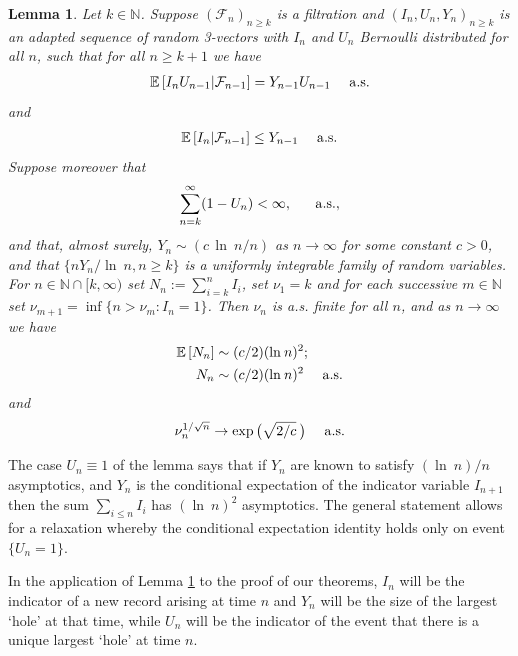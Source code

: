 \documentclass[12pt]{article}
\newcommand{\N}{\mathbb{N}}
\newcommand{\cF}{\mathcal{F}}
\newcommand{\E}{\mathbb E \,}
\renewcommand{\emptyset}{\varnothing}
\newcommand{\F}{{\cal F}}
\renewcommand{\log}{{\ln \:}}
\newtheorem{lemm}{Lemma}
\begin{document}
\begin{lemm}
	\label{l:genrec}
	Let $k \in \N$.
	Suppose $(\cF_n)_{n \geq k}$ is a filtration and
	$(I_n,U_n,Y_n)_{n \geq k}$
	is an adapted sequence of random 3-vectors with $I_n$
	and $U_n$ Bernoulli distributed for all $n$, 
	such that for all $n \geq k+1$ we have %
	\begin{align}
		\E [ I_nU_{n-1} | \F_{n-1} ] = Y_{n-1} U_{n-1} ~~~~ {\rm a.s.}
\label{0116c}
	\end{align}
	and 
	\begin{align}
		\E[ I_n | \F_{n-1} ] \leq Y_{n-1} ~~~~ {\rm a.s.}
	\label{e:squeeze}
	\end{align}
	Suppose moreover that %
	\begin{align}
		\sum_{n=k}^\infty (1- U_n)  < \infty, ~~~~~{\rm a.s.},
		\label{e:Enev}
		\end{align}
	and that,  almost surely, $Y_n \sim (c\, \log n/n)$ as
	$n \to \infty$ for some constant $c >0$,
	and that $\{n Y_n/\log n, n \geq k\}$ is a uniformly integrable
	family of random variables. For $n \in \N \cap [k,\infty)$ set
	$N_n := \sum_{i=k}^n I_i$, set
$\nu_{1} =k$ and for each successive $m \in \N$ set
	$\nu_{m+1} = \inf\{n > \nu_{m}: I_n =1 \}$. 
	Then $\nu_n$ is a.s. finite for all $n$, and as $n \to \infty$ we have 
	\begin{align}
		\E[N_{n}] & \sim (c/2)( \log n )^2;
\label{0125ac}
		\\
		N_{n} & \sim (c/2)( \log n )^2
~~~~{\rm a.s.}
\label{0125bc}
	\end{align} 
and
	\begin{align}
	\nu_{n}^{1/\sqrt{n}} \to \exp \big( \sqrt{2/c} \: \big)   
~~~~{\rm a.s.}
\label{0125cc}
	\end{align}
\end{lemm}
The case $U_n \equiv 1$ of the
lemma says that if $Y_n$ are known to satisfy $(\log n)/n$ asymptotics,
and $Y_n$ is the conditional expectation of the indicator variable 
$I_{n+1}$
then the sum $\sum_{i \leq n} I_i$ has $(\log n)^2$ asymptotics. 
The  general statement allows for a relaxation whereby the
conditional expectation identity holds only on event $\{U_n=1\}$.

In the application of Lemma \ref{l:genrec} to the proof of our theorems,
$I_n$ will be the indicator of a new record arising at time $n$ and
$Y_n$ will be the size of the largest `hole' at that time, while $U_n$ will
be the indicator of the event that there is a unique largest `hole' at time $n$.
\end{document}
